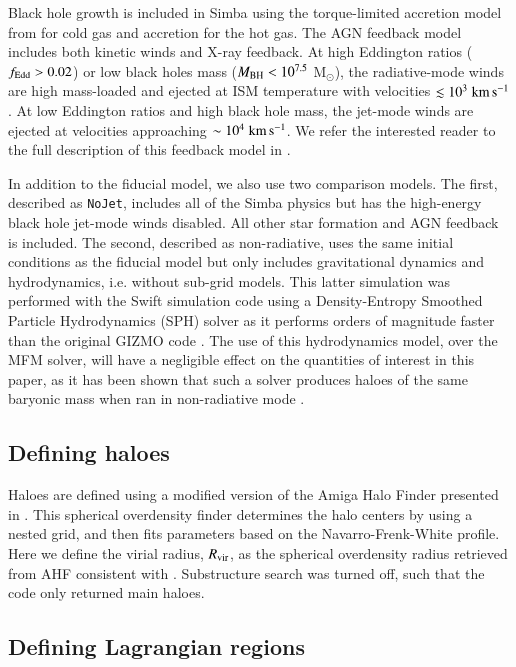 \documentclass[fleqn,usenatbib]{mnras}
\newcommand{\kms}{\;{\rm km}\,{\rm s}^{-1}}
\newcommand{\simba}{{\sc Simba}}
\newcommand{\nojet}{{\tt NoJet}}
\begin{document}
Black hole growth is included in \simba{} using the torque-limited accretion
model from \citet{AnglesAlcazar2017b} for cold gas and \citet{Bondi1952}
accretion for the hot gas. The AGN feedback model includes both kinetic winds
and X-ray feedback. At high Eddington ratios ($f_{\rm Edd} > 0.02$) or low
black holes mass ($M_{\rm BH} < 10^{7.5}$ M$_\odot$), the radiative-mode
winds are high mass-loaded and ejected at ISM temperature with velocities
$\lesssim 10^3 \kms{}$. At low Eddington ratios and high black hole mass, the
jet-mode winds are ejected at velocities approaching $\sim 10^4\kms{}$. We
refer the interested reader to the full description of this feedback model in
\citet{Dave2019}.

In addition to the fiducial model, we also use two comparison models. The
first, described as \nojet{}, includes all of the \simba{} physics but has
the high-energy black hole jet-mode winds disabled. All other star formation
and AGN feedback is included. The second, described as non-radiative, uses
the same initial conditions as the fiducial model but only includes
gravitational dynamics and hydrodynamics, i.e. without sub-grid models. This
latter simulation was performed with the {\sc Swift} simulation code
\citep{Schaller2016} using a Density-Entropy Smoothed Particle Hydrodynamics
(SPH) solver as it performs orders of magnitude faster than the original
GIZMO code \citep{Borrow2018}. The use of this hydrodynamics model, over the
MFM solver, will have a negligible effect on the quantities of interest in
this paper, as it has been shown that such a solver produces haloes of the
same baryonic mass when ran in non-radiative mode \citep[see
e.g.][]{Sembolini2016}.

\subsection{Defining haloes}

Haloes are defined using a modified version of the Amiga Halo Finder
\citep[AHF, ][]{Gill2004, Knollmann2009} presented in \citet{Muratov2015}.
This spherical overdensity finder determines the halo centers by using a
nested grid, and then fits parameters based on the Navarro-Frenk-White
\citep[NFW, ][]{Navarro1995} profile. Here we define the virial radius,
$R_{\rm vir}$, as the spherical overdensity radius retrieved from AHF consistent
with \citet{Bryan1998}. Substructure search was turned off, such that the
code only returned main haloes.

\subsection{Defining Lagrangian regions}
\end{document}
